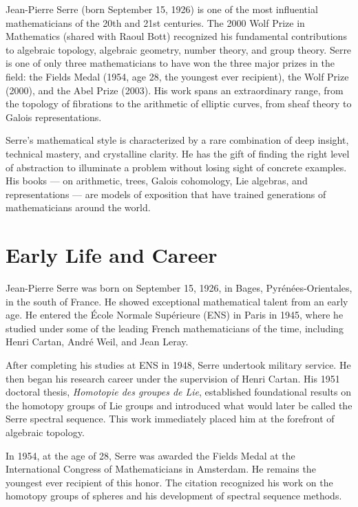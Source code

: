 Jean-Pierre Serre (born September 15, 1926) is one of the most influential mathematicians of the 20th and 21st centuries. The 2000 Wolf Prize in Mathematics (shared with Raoul Bott) recognized his fundamental contributions to algebraic topology, algebraic geometry, number theory, and group theory. Serre is one of only three mathematicians to have won the three major prizes in the field: the Fields Medal (1954, age 28, the youngest ever recipient), the Wolf Prize (2000), and the Abel Prize (2003). His work spans an extraordinary range, from the topology of fibrations to the arithmetic of elliptic curves, from sheaf theory to Galois representations.

Serre's mathematical style is characterized by a rare combination of deep insight, technical mastery, and crystalline clarity. He has the gift of finding the right level of abstraction to illuminate a problem without losing sight of concrete examples. His books --- on arithmetic, trees, Galois cohomology, Lie algebras, and representations --- are models of exposition that have trained generations of mathematicians around the world.

\section{Early Life and Career}

Jean-Pierre Serre was born on September 15, 1926, in Bages, Pyr\'en\'ees-Orientales, in the south of France. He showed exceptional mathematical talent from an early age. He entered the \'Ecole Normale Sup\'erieure (ENS) in Paris in 1945, where he studied under some of the leading French mathematicians of the time, including Henri Cartan, Andr\'e Weil, and Jean Leray.

After completing his studies at ENS in 1948, Serre undertook military service. He then began his research career under the supervision of Henri Cartan. His 1951 doctoral thesis, \textit{Homotopie des groupes de Lie}, established foundational results on the homotopy groups of Lie groups and introduced what would later be called the Serre spectral sequence. This work immediately placed him at the forefront of algebraic topology.

In 1954, at the age of 28, Serre was awarded the Fields Medal at the International Congress of Mathematicians in Amsterdam. He remains the youngest ever recipient of this honor. The citation recognized his work on the homotopy groups of spheres and his development of spectral sequence methods.

